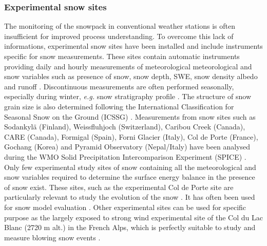 \documentclass[hydrology,article,submit,moreauthors,pdftex]{Definitions/mdpi}
\begin{document}
\subsubsection{Experimental snow sites}

The monitoring of the snowpack in conventional weather stations is often insufficient for improved process understanding. To overcome this lack of informations, experimental snow sites have been installed and include instruments specific for snow measurements. These sites contain automatic instruments providing daily and hourly measurements of meteorological meteorological and snow variables such as presence of snow, snow depth, SWE, snow density albedo and runoff \citep{Pirazzini_2018}. Discontinuous measurements are often performed seasonally, especially during winter, \textit{e.g.} snow stratigraphy profile \citep{Morin_2012}. The structure of snow grain size is also determined following the International Classification for Seasonal Snow on the Ground (ICSSG)  \citep{Fierz_2009}. Measurements from snow sites such as Sodankylä (Finland), Weissfluhjoch (Switzerland), Caribou Creek (Canada), CARE
(Canada), Formigal (Spain), Forni
Glacier (Italy), Col de Porte (France), Gochang (Korea) and Pyramid Observatory (Nepal/Italy) have been analysed during the WMO Solid Precipitation Intercomparison Experiment (SPICE) \citep{Smith_2017}. Only few experimental study sites of snow containing all the meteorological and snow variables required to determine the surface energy balance in the presence of snow exist. These sites, such as the experimental Col de Porte site are particularly relevant to study the evolution of the snow \citep{Morin_2012,Lejeune_2018}. %
It has often been used for snow model evaluation \citep{Brun_1992,Vionnet_2012,Decharme_2016,Wang_2013,Krinner_2018}. 
Other experimental sites can be used for specific purpose as the largely exposed to strong wind experimental site of the Col du Lac Blanc (2720 m alt.) in the French Alps, which is perfectly suitable to study and measure blowing snow events \citep{Vionnet_2013,Guyomarch_2018}. 
\end{document}
